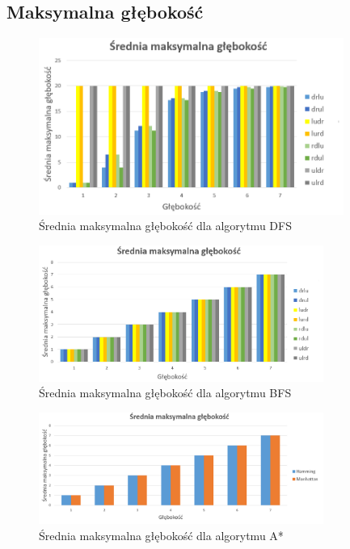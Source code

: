 \documentclass{classrep}
\begin{document}
\newpage
\subsection{Maksymalna głębokość}
\begin{figure}[h!]
    \centering
    \includegraphics[width=0.89\textwidth]{maxdepthDFS.png}
    \caption{Średnia maksymalna głębokość dla algorytmu DFS}
	\label{maxdepthDFS}
\end{figure}
\begin{figure}[h!]
    \centering
    \includegraphics[width=0.83\textwidth]{maxdepthBFS.png}
    \caption{Średnia maksymalna głębokość dla algorytmu BFS}
	\label{maxdepthBFS}
\end{figure}
\begin{figure}[h!]
    \centering
    \includegraphics[width=0.83\textwidth]{maxdepthAstar.png}
    \caption{Średnia maksymalna głębokość dla algorytmu A*}
	\label{maxdepthASTR}
\end{figure}
\end{document}
